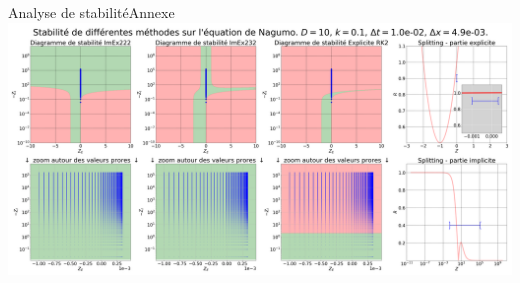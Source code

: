 \begin{frame}{Analyse de stabilité}{Annexe}
    \includegraphics[width = \textwidth]{medias/2_/1_/STABILITE_D10_k0.1_dt1.0e-02_dx4.9e-03.png}
\end{frame}